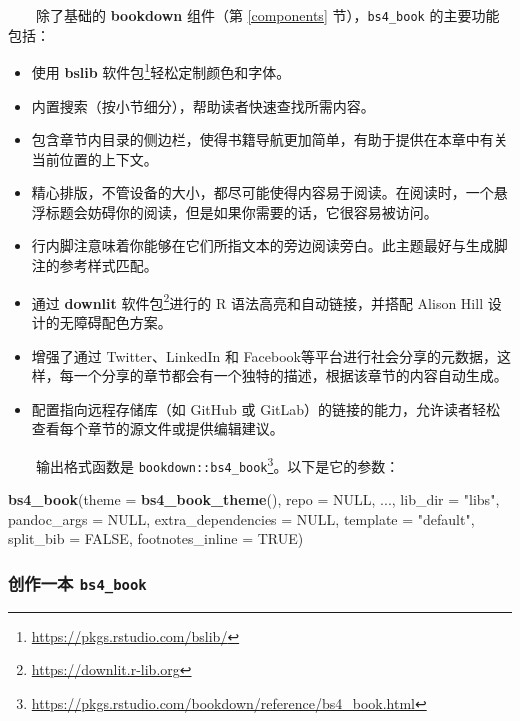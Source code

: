 \documentclass[
  12pt,
]{krantz}
\newenvironment{Shaded}{\begin{snugshade}}{\end{snugshade}}
\newcommand{\AttributeTok}[1]{\textcolor[rgb]{0.13,0.29,0.53}{#1}}
\newcommand{\ConstantTok}[1]{\textcolor[rgb]{0.56,0.35,0.01}{#1}}
\newcommand{\FunctionTok}[1]{\textcolor[rgb]{0.13,0.29,0.53}{\textbf{#1}}}
\newcommand{\NormalTok}[1]{#1}
\newcommand{\StringTok}[1]{\textcolor[rgb]{0.31,0.60,0.02}{#1}}
\renewcommand{\href}[2]{#2\footnote{\url{#1}}}
\theoremstyle{definition}
\theoremstyle{definition}
\theoremstyle{definition}
\theoremstyle{definition}
\theoremstyle{remark}
\begin{document}
  除了基础的 \textbf{bookdown} 组件（第 \ref{components} 节），\texttt{bs4\_book} 的主要功能包括：

\begin{itemize}
\item
  使用 \href{https://pkgs.rstudio.com/bslib/}{\textbf{bslib} 软件包}轻松定制颜色和字体。
\item
  内置搜索（按小节细分），帮助读者快速查找所需内容。
\item
  包含章节内目录的侧边栏，使得书籍导航更加简单，有助于提供在本章中有关当前位置的上下文。
\item
  精心排版，不管设备的大小，都尽可能使得内容易于阅读。在阅读时，一个悬浮标题会妨碍你的阅读，但是如果你需要的话，它很容易被访问。
\item
  行内脚注意味着你能够在它们所指文本的旁边阅读旁白。此主题最好与生成脚注的参考样式匹配。
\item
  通过 \href{https://downlit.r-lib.org}{\textbf{downlit} 软件包}进行的 R 语法高亮和自动链接，并搭配 Alison Hill 设计的无障碍配色方案。
\item
  增强了通过 Twitter、LinkedIn 和 Facebook等平台进行社会分享的元数据，这样，每一个分享的章节都会有一个独特的描述，根据该章节的内容自动生成。
\item
  配置指向远程存储库（如 GitHub 或 GitLab）的链接的能力，允许读者轻松查看每个章节的源文件或提供编辑建议。
\end{itemize}

  输出格式函数是 \href{https://pkgs.rstudio.com/bookdown/reference/bs4_book.html}{\texttt{bookdown::bs4\_book}}。以下是它的参数：

\begin{Shaded}
\begin{Highlighting}[]
\FunctionTok{bs4\_book}\NormalTok{(}\AttributeTok{theme =} \FunctionTok{bs4\_book\_theme}\NormalTok{(), }\AttributeTok{repo =} \ConstantTok{NULL}\NormalTok{, ...,}
  \AttributeTok{lib\_dir =} \StringTok{"libs"}\NormalTok{, }\AttributeTok{pandoc\_args =} \ConstantTok{NULL}\NormalTok{,}
  \AttributeTok{extra\_dependencies =} \ConstantTok{NULL}\NormalTok{, }\AttributeTok{template =} \StringTok{"default"}\NormalTok{,}
  \AttributeTok{split\_bib =} \ConstantTok{FALSE}\NormalTok{, }\AttributeTok{footnotes\_inline =} \ConstantTok{TRUE}\NormalTok{)}
\end{Highlighting}
\end{Shaded}

\hypertarget{ux521bux4f5cux4e00ux672c-bs4_book}{%
\subsubsection{\texorpdfstring{创作一本 \texttt{bs4\_book}}{创作一本 bs4\_book}}\label{ux521bux4f5cux4e00ux672c-bs4_book}}
\end{document}
